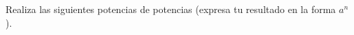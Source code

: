 \question[10] Realiza las siguientes potencias de potencias (expresa tu resultado en la forma $a^n$).
\begin{multicols}{2}
\begin{parts}
    
    
    
    
    
    
    
    
    
    
    
\end{parts}
\end{multicols}